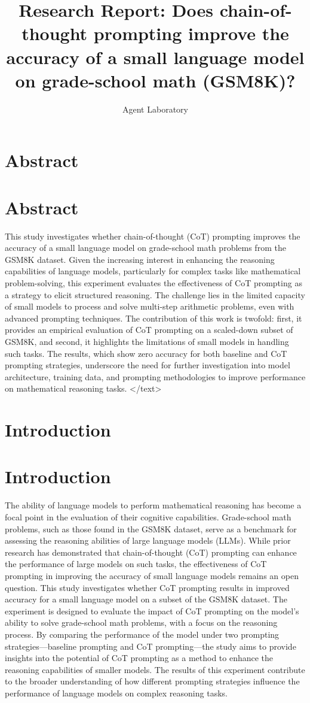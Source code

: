 \documentclass{article}
\title{Research Report: Does chain-of-thought prompting improve the accuracy of a small language model on grade-school math (GSM8K)?}
\author{Agent Laboratory}
\begin{document}
\maketitle
\section{Abstract}
\section*{Abstract}
This study investigates whether chain-of-thought (CoT) prompting improves the accuracy of a small language model on grade-school math problems from the GSM8K dataset. Given the increasing interest in enhancing the reasoning capabilities of language models, particularly for complex tasks like mathematical problem-solving, this experiment evaluates the effectiveness of CoT prompting as a strategy to elicit structured reasoning. The challenge lies in the limited capacity of small models to process and solve multi-step arithmetic problems, even with advanced prompting techniques. The contribution of this work is twofold: first, it provides an empirical evaluation of CoT prompting on a scaled-down subset of GSM8K, and second, it highlights the limitations of small models in handling such tasks. The results, which show zero accuracy for both baseline and CoT prompting strategies, underscore the need for further investigation into model architecture, training data, and prompting methodologies to improve performance on mathematical reasoning tasks.
</text>
\section{Introduction}
\section*{Introduction}

The ability of language models to perform mathematical reasoning has become a focal point in the evaluation of their cognitive capabilities. Grade-school math problems, such as those found in the GSM8K dataset, serve as a benchmark for assessing the reasoning abilities of large language models (LLMs). While prior research has demonstrated that chain-of-thought (CoT) prompting can enhance the performance of large models on such tasks, the effectiveness of CoT prompting in improving the accuracy of small language models remains an open question. This study investigates whether CoT prompting results in improved accuracy for a small language model on a subset of the GSM8K dataset. The experiment is designed to evaluate the impact of CoT prompting on the model's ability to solve grade-school math problems, with a focus on the reasoning process. By comparing the performance of the model under two prompting strategies—baseline prompting and CoT prompting—the study aims to provide insights into the potential of CoT prompting as a method to enhance the reasoning capabilities of smaller models. The results of this experiment contribute to the broader understanding of how different prompting strategies influence the performance of language models on complex reasoning tasks.
\end{document}
